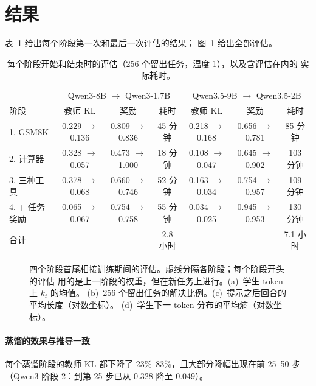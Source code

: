 \documentclass[11pt,a4paper,fontset=none]{ctexart}
\begin{document}
\section{结果}
\label{sec:results}

表~\ref{tab:results} 给出每个阶段第一次和最后一次评估的结果；
图~\ref{fig:curves} 给出全部评估。

\begin{table}[t]
\centering\small
\caption{每个阶段开始和结束时的评估（256 个留出任务，温度 1），以及含评估在内的
实际耗时。}
\label{tab:results}
\setlength{\tabcolsep}{4.5pt}
\begin{tabular}{@{}lcccccc@{}}
\toprule
\headrow & \multicolumn{3}{c}{Qwen3-8B $\to$ Qwen3-1.7B}
 & \multicolumn{3}{c}{Qwen3.5-9B $\to$ Qwen3.5-2B} \\
\headrow 阶段 & 教师 KL & 奖励 & 耗时 & 教师 KL & 奖励 & 耗时 \\
\midrule
1. GSM8K & 0.229 $\to$ 0.136 & 0.809 $\to$ 0.836 & 45 分钟
  & 0.218 $\to$ 0.168 & 0.656 $\to$ 0.781 & 85 分钟 \\
2. 计算器 & 0.328 $\to$ 0.057 & 0.473 $\to$ 1.000 & 18 分钟
  & 0.108 $\to$ 0.047 & 0.645 $\to$ 0.902 & 103 分钟 \\
3. 三种工具 & 0.378 $\to$ 0.068 & 0.660 $\to$ 0.746 & 52 分钟
  & 0.163 $\to$ 0.034 & 0.754 $\to$ 0.957 & 109 分钟 \\
4. + 任务奖励 & 0.065 $\to$ 0.067 & 0.754 $\to$ 0.758 & 55 分钟
  & 0.034 $\to$ 0.025 & 0.945 $\to$ 0.953 & 130 分钟 \\
\midrule
合计 & & & 2.8 小时 & & & 7.1 小时 \\
\bottomrule
\end{tabular}
\end{table}

\begin{figure}[t]
\centering

\caption{四个阶段首尾相接训练期间的评估。虚线分隔各阶段；每个阶段开头的评估
用的是上一阶段的权重，但在新任务上进行。(a)~学生 token 上 $k_t$ 的均值。
(b)~256 个留出任务的解决比例。(c)~提示之后回合的平均长度（对数坐标）。
(d)~学生下一 token 分布的平均熵（对数坐标）。}
\label{fig:curves}
\end{figure}

\paragraph{蒸馏的效果与推导一致}
每个蒸馏阶段的教师 KL 都下降了 23\%--83\%，且大部分降幅出现在前 25--50 步
（Qwen3 阶段 2：到第 25 步已从 0.328 降至 0.049）。
\end{document}
